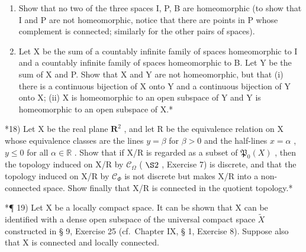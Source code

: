\begin{enumerate}
\def\labelenumi{\alph{enumi})}
\item
  Show that no two of the three spaces I, P, B are homeomorphic (to show that I and P are not homeomorphic, notice that there are points in P whose complement is connected; similarly for the other pairs of spaces).
\item
  Let X be the sum of a countably infinite family of spaces homeomorphic to I and a countably infinite family of spaces homeomorphic to B. Let Y be the sum of X and P. Show that X and Y are not homeomorphic, but that (i) there is a continuous bijection of X onto Y and a continuous bijection of Y onto X; (ii) X is homeomorphic to an open subspace of Y and Y is homeomorphic to an open subspace of X.*
\end{enumerate}

*18) Let X be the real plane \(\mathbf{R}^2\) , and let R be the equivalence relation on X whose equivalence classes are the lines \(y = \beta\) for \(\beta > 0\) and the half-lines \(x = \alpha\) , \(y \leqslant 0\) for all \(\alpha \in \mathbb{R}\) . Show that if X/R is regarded as a subset of \(\mathfrak{P}_0(X)\) , then the topology induced on X/R by \(\mathcal{C}_{\Omega}\) ( \(\S 2\) , Exercise 7) is discrete, and that the topology induced on X/R by \(\mathcal{C}_{\Phi}\) is not discrete but makes X/R into a non-connected space. Show finally that X/R is connected in the quotient topology.*

*¶ 19) Let X be a locally compact space. It can be shown that X can be identified with a dense open subspace of the universal compact space \(\tilde{X}\) constructed in § 9, Exercise 25 (cf.~Chapter IX, § 1, Exercise 8). Suppose also that X is connected and locally connected.

